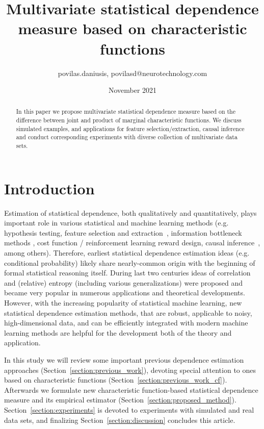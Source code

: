 \documentclass{article}
\title{Multivariate statistical dependence measure based on characteristic functions}
\author{povilas.daniusis, povilasd@neurotechnology.com}
\date{November 2021}
\begin{document}
\maketitle

\begin{abstract}
    In this paper we propose  multivariate statistical dependence measure based on the difference between joint and product of marginal characteristic functions. We discuss simulated examples, and applications for feature selection/extraction, causal inference and conduct corresponding experiments with diverse collection of multivariate data sets.
\end{abstract}

\section{Introduction}
Estimation of statistical dependence, both qualitatively and quantitatively, plays important role in various statistical and machine learning methods (e.g. hypothesis testing, feature selection and extraction~\cite{?}, information bottleneck methods \cite{?}, cost function / reinforcement learning reward design, causal inference~\cite{?}, among others). Therefore, earliest statistical dependence estimation ideas (e.g. conditional probability) likely share nearly-common origin with the beginning of formal statistical reasoning itself. During last two centuries ideas of correlation and (relative) entropy (including various generalizations) were proposed and became very popular in numerous applications and theoretical developments. However, with the increasing popularity of statistical machine learning, new statistical dependence estimation methods, that are robust, applicable to noisy, high-dimensional data, and can be efficiently integrated with modern machine learning methods are helpful for the development both of the theory and application.

In this study we will review some important previous dependence estimation approaches (Section~\ref{section:previous_work}), devoting special attention to ones based on characteristic functions (Section~\ref{section:previous_work_cf}). Afterwards we formulate new characteristic function-based statistical dependence measure and its empirical estimator (Section~\ref{section:proposed_method}). Section~\ref{section:experiments} is devoted to experiments with simulated and real data sets, and finalizing Section~\ref{section:discussion} concludes this article.
\end{document}

